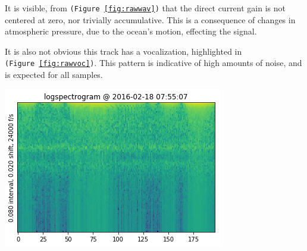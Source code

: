 \documentclass{article}
\newenvironment{Figure}
  {\par\medskip\noindent\minipage{\linewidth}}
  {\endminipage\par\medskip}
\begin{document}
\begin{multicols}{2}
\newcommand{\figsite}[1]{\texttt{(Figure~\ref{#1})}\xspace}

It is visible, from \figsite{fig:rawwav}
that the direct current gain is not centered at zero, nor trivially accumulative. This
is a consequence of changes in atmospheric pressure, due to the ocean's motion,
effecting the signal. %

It is also not obvious this track has a vocalization, highlighted in \figsite{fig:rawvoc}.
This pattern is indicative of high amounts of noise, and is expected for all samples.

\begin{Figure}
  \includegraphics[width=\columnwidth]{./rawspec.png}
  \label{fig:rawspec}
\end{Figure}



\end{multicols}
\end{document}
